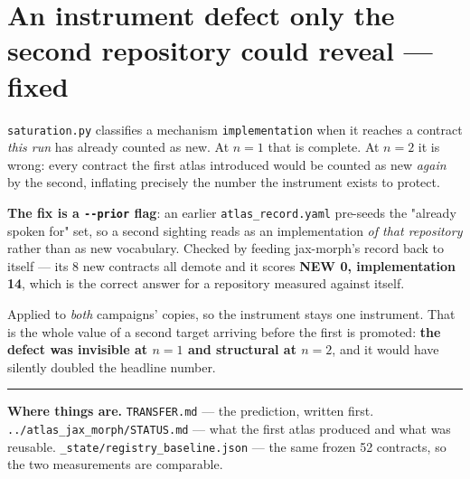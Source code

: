\documentclass[11pt,a4paper]{article}
\newcommand{\code}[1]{\texttt{#1}}
\begin{document}
\section{An instrument defect only the second repository could reveal --- fixed}\label{sec:gap}

\code{saturation.py} classifies a mechanism \code{implementation} when it reaches a contract
\emph{this run} has already counted as new. At $n=1$ that is complete. At $n=2$ it is wrong: every
contract the first atlas introduced would be counted as new \emph{again} by the second, inflating
precisely the number the instrument exists to protect.

\textbf{The fix is a \code{-{}-prior} flag}: an earlier \code{atlas\_record.yaml} pre-seeds the
"already spoken for" set, so a second sighting reads as an implementation \emph{of that
repository} rather than as new vocabulary. Checked by feeding jax-morph's record back to itself ---
its 8 new contracts all demote and it scores \textbf{NEW 0, implementation 14}, which is the
correct answer for a repository measured against itself.

Applied to \emph{both} campaigns' copies, so the instrument stays one instrument. That is the whole
value of a second target arriving before the first is promoted: \textbf{the defect was invisible
at $n=1$ and structural at $n=2$}, and it would have silently doubled the headline number.

\vspace{6pt}
\hrule
\vspace{6pt}
{\small\color{grey}
\textbf{Where things are.} \code{TRANSFER.md} --- the prediction, written first.
\code{../atlas\_jax\_morph/STATUS.md} --- what the first atlas produced and what was reusable.
\code{\_state/registry\_baseline.json} --- the same frozen 52 contracts, so the two measurements
are comparable.}
\end{document}
